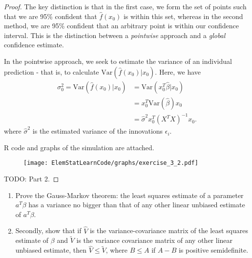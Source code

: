 \begin{proof}
    The key distinction is that in the first case, we form the set of points such that we are 95\% confident that $\hat f(x_0)$ is within this set, whereas in the second method, we are 95\% confident that an arbitrary point is within our confidence interval.  This is the distinction between a \emph{pointwise} approach and a \emph{global} confidence estimate. 
    
    In the pointwise approach, we seek to estimate the variance of an individual prediction - that is, to calculate $\text{Var}(\hat f(x_0) | x_0)$.  Here, we have \begin{align*}
        \sigma_0^2 = \text{Var}(\hat f(x_0) | x_0) &= \text{Var}(x_0^T \hat \beta | x_0) \\
                                    &= x_0^T \text{Var}(\hat \beta) x_0 \\
                                    &= \hat \sigma^2 x_0^T (X^T X)^{-1} x_0.
    \end{align*} where $\hat \sigma^2$ is the estimated variance of the innovations $\epsilon_i$.
    
    R code and graphs of the simulation are attached.
    \clearpage
    
    \clearpage
    \begin{figure}
	\centering\texttt{[image: ElemStatLearnCode/graphs/exercise\_3\_2.pdf]}
    \end{figure}


    TODO: Part 2.
\end{proof}

\begin{exer}
    \begin{enumerate}
    \item Prove the Gauss-Markov theorem: the least squares estimate of a parameter $a^T\beta$ has a variance no bigger than that of any other linear unbiased estimate of $a^T\beta$.

    \item Secondly, show that if $\hat V$ is the variance-covariance matrix of the least squares estimate of $\beta$ and $\tilde V$ is the variance covariance matrix of any other linear unbiased estimate, then $\hat V \leq \tilde V$, where $B \leq A$ if $A - B$ is positive semidefinite.
    \end{enumerate}
\end{exer}


